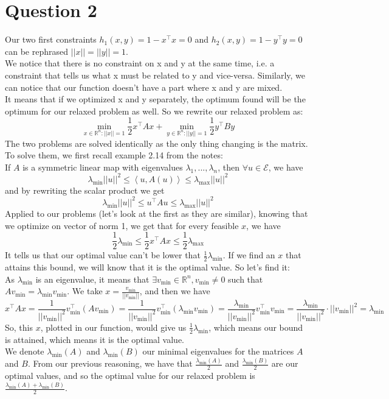 \documentclass{article}
\newcommand{\R}{\mathbb{R}}
\newcommand{\tp}{^\top}
\begin{document}
\section*{Question 2}

Our two first constraints $h_1(x,y)=1-x\tp x =0$ and $h_2(x,y)=1-y\tp y =0$ can be rephrased $||x||=||y||=1$.\\
We notice that there is no constraint on x and y at the same time, i.e. a constraint that tells us what x must be related to y and vice-versa. Similarly, we can notice that our function doesn't have a part where x and y are mixed.\\
It means that if we optimized x and y separately, the optimum found will be the optimum for our relaxed problem as well. So we rewrite our relaxed problem as:
$$\min_{x\in \R^n:||x||=1}  \frac{1}{2} x\tp A x +\min_{y \in \R^n:||y||=1} \frac{1}{2} y\tp B y$$
The two problems are solved identically as the only thing changing is the matrix. To solve them, we first recall example 2.14 from the notes:\\
If $A$ is a symmetric linear map with eigenvalues $\lambda_1, ...,\lambda_n$, then $\forall u \in \mathcal{E}$, we have $$\lambda_{\min} ||u||^2 \leq \left< u, A(u)\right>\leq \lambda_{\max}||u||^2$$
and by rewriting the scalar product we get 
$$\lambda_{\min} ||u||^2 \leq u\tp A u \leq \lambda_{\max} ||u||^2$$
Applied to our problems (let's look at the first as they are similar), knowing that we optimize on vector of norm 1, we get that for every feasible $x$, we have
$$\frac{1}{2}\lambda_{\min}  \leq\frac{1}{2} x\tp A x \leq\frac{1}{2} \lambda_{\max} $$
It tells us that our optimal value can't be lower that $\frac{1}{2} \lambda_{\min}$. If we find an $x$ that attains this bound, we will know that it is the optimal value. So let's find it:\\
As $\lambda_{\min}$ is an eigenvalue, it means that $\exists v_{\min} \in \R^n, v_{\min} \neq 0$ such that $A v_{\min}=\lambda_{\min} v_{\min}$. We take $x=\frac{v_{\min}}{||v_{\min}||}$, and then we have
$$x\tp A x =\frac{1}{||v_{\min}||^2} v_{\min}\tp \left( A v_{\min} \right)=\frac{1}{||v_{\min}||^2} v_{\min}\tp (\lambda_{\min} v_{\min})=\frac{\lambda_{\min}}{||v_{\min}||^2} v_{\min}\tp v_{\min}=\frac{\lambda_{\min}}{||v_{\min}||^2} \cdot ||v_{\min}||^2=\lambda_{\min}$$
So, this $x$, plotted in our function, would give us $\frac{1}{2}\lambda_{\min} $, which means our bound is attained, which means it is the optimal value. \\
We denote $\lambda_{\min} (A)$ and $\lambda_{\min} (B)$ our minimal eigenvalues for the matrices $A$ and $B$. From our previous reasoning, we have that $\frac{\lambda_{\min} (A)}{2}$ and $\frac{\lambda_{\min} (B)}{2}$ are our optimal values, and so the optimal value for our relaxed problem is $\frac{\lambda_{\min} (A)+\lambda_{\min} (B)}{2}$.
\end{document}
